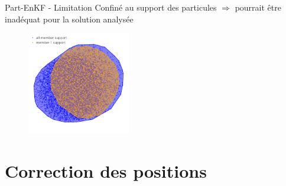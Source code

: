 \documentclass[aspectratio=169]{beamer} %
\begin{document}
\begin{frame}{Part-EnKF - Limitation}
    Confiné au support des particules $\Rightarrow$ pourrait être inadéquat pour la solution analysée
    \begin{figure}
        \centering
        \includegraphics[width=0.4\textwidth]{../../conference/images/ens_particles.pdf}
    \end{figure}
\end{frame}

\section{Correction des positions}
\end{document}
